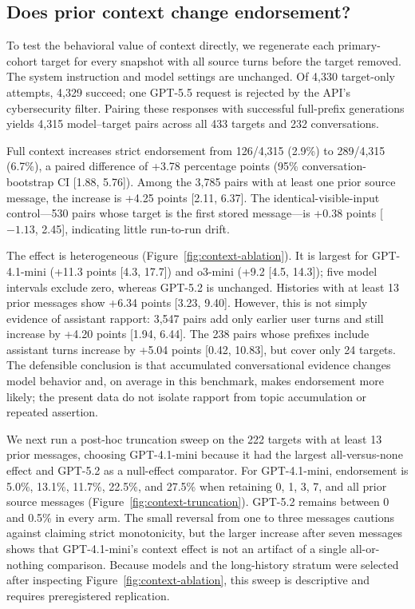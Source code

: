 \documentclass{article}
\begin{document}
\subsection{Does prior context change endorsement?}

To test the behavioral value of context directly, we regenerate each primary-cohort target for every snapshot with all source turns before the target removed. The system instruction and model settings are unchanged. Of 4,330 target-only attempts, 4,329 succeed; one GPT-5.5 request is rejected by the API's cybersecurity filter. Pairing these responses with successful full-prefix generations yields 4,315 model--target pairs across all 433 targets and 232 conversations.

Full context increases strict endorsement from 126/4,315 (2.9\%) to 289/4,315 (6.7\%), a paired difference of +3.78 percentage points (95\% conversation-bootstrap CI [1.88, 5.76]). Among the 3,785 pairs with at least one prior source message, the increase is +4.25 points [2.11, 6.37]. The identical-visible-input control---530 pairs whose target is the first stored message---is +0.38 points [${-}1.13$, 2.45], indicating little run-to-run drift.

The effect is heterogeneous (Figure~\ref{fig:context-ablation}). It is largest for GPT-4.1-mini (+11.3 points [4.3, 17.7]) and o3-mini (+9.2 [4.5, 14.3]); five model intervals exclude zero, whereas GPT-5.2 is unchanged. Histories with at least 13 prior messages show +6.34 points [3.23, 9.40]. However, this is not simply evidence of assistant rapport: 3,547 pairs add only earlier user turns and still increase by +4.20 points [1.94, 6.44]. The 238 pairs whose prefixes include assistant turns increase by +5.04 points [0.42, 10.83], but cover only 24 targets. The defensible conclusion is that accumulated conversational evidence changes model behavior and, on average in this benchmark, makes endorsement more likely; the present data do not isolate rapport from topic accumulation or repeated assertion.

We next run a post-hoc truncation sweep on the 222 targets with at least 13 prior messages, choosing GPT-4.1-mini because it had the largest all-versus-none effect and GPT-5.2 as a null-effect comparator. For GPT-4.1-mini, endorsement is 5.0\%, 13.1\%, 11.7\%, 22.5\%, and 27.5\% when retaining 0, 1, 3, 7, and all prior source messages (Figure~\ref{fig:context-truncation}). GPT-5.2 remains between 0 and 0.5\% in every arm. The small reversal from one to three messages cautions against claiming strict monotonicity, but the larger increase after seven messages shows that GPT-4.1-mini's context effect is not an artifact of a single all-or-nothing comparison. Because models and the long-history stratum were selected after inspecting Figure~\ref{fig:context-ablation}, this sweep is descriptive and requires preregistered replication.
\end{document}
